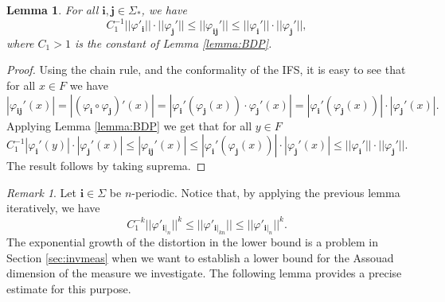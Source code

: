 \documentclass{PRM}
\theoremstyle{plain}
\newtheorem{lemma}[thm]{Lemma}
\theoremstyle{definition}
\theoremstyle{remark}
\newtheorem{huom}[thm]{Remark}
\begin{document}
\begin{lemma}\label{lemma:chain}
For all $\mathbf{i},\mathbf{j}\in\Sigma_*$, we have
\begin{equation*}
    C_1^{-1}||\varphi'_{\mathbf{i}}||\cdot||\varphi_{\mathbf{j}}'||\leq||\varphi_{\mathbf{i}\mathbf{j}}'||\leq ||\varphi_{\mathbf{i}}'||\cdot||\varphi_{\mathbf{j}}'||,
\end{equation*}
where $C_1>1$ is the constant of Lemma \ref{lemma:BDP}.
\end{lemma}
\begin{proof}
Using the chain rule, and the conformality of the IFS, it is easy to see that for all $x\in F$ we have
\begin{equation*}
    |\varphi_{\mathbf{i}\mathbf{j}}'(x)|= |(\varphi_{\mathbf{i}}\circ\varphi_{\mathbf{j}})'(x)|
    =|\varphi_{\mathbf{i}}'(\varphi_{\mathbf{j}}(x))\cdot\varphi_{\mathbf{j}}'(x)|=|\varphi_{\mathbf{i}}'(\varphi_{\mathbf{j}}(x))|\cdot|\varphi_{\mathbf{j}}'(x)|.
\end{equation*}
Applying Lemma \ref{lemma:BDP} we get that for all $y\in F$
\begin{equation*}
    C_1^{-1}|\varphi_{\mathbf{i}}'(y)|\cdot|\varphi_{\mathbf{j}}'(x)|\leq |\varphi_{\mathbf{i}\mathbf{j}}'(x)| \leq |\varphi_{\mathbf{i}}'(\varphi_{\mathbf{j}}(x))|\cdot|\varphi_{\mathbf{j}}'(x)|\leq ||\varphi_{\mathbf{i}}'||\cdot||\varphi_{\mathbf{j}}'||.
\end{equation*}
The result follows by taking suprema.
\end{proof}
\begin{huom}
Let $\mathbf{i}\in\Sigma$ be $n$-periodic. Notice that, by applying the previous lemma iteratively, we have
\begin{equation*}
    C_1^{-k}||\varphi'_{\mathbf{i}|_n}||^k\leq||\varphi'_{\mathbf{i}|_{kn}}||\leq ||\varphi'_{\mathbf{i}|_n}||^k.
\end{equation*}
The exponential growth of the distortion in the lower bound is a problem in Section \ref{sec:invmeas} when we want to establish a lower bound for the Assouad dimension of the measure we investigate. The following lemma provides a precise estimate for this purpose.
\end{huom}
\end{document}
